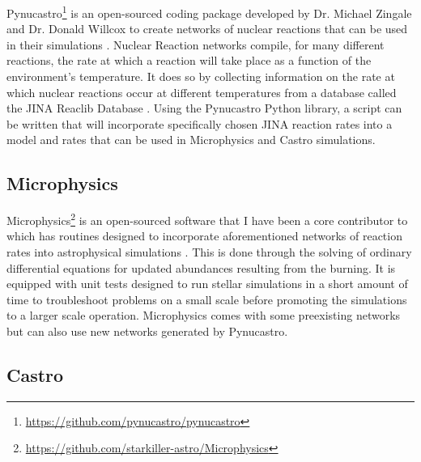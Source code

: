 \documentclass[preprint]{aastex62}
\begin{document}
    Pynucastro\footnote{\url{https://github.com/pynucastro/pynucastro}} is an open-sourced coding package developed by Dr. Michael Zingale and Dr. Donald Willcox to create networks of nuclear reactions that can be used in their simulations \citep{pynucastro}. Nuclear Reaction networks compile, for many different reactions, the rate at which a reaction will take place as a function of the environment's temperature. It does so by collecting information on the rate at which nuclear reactions occur at different temperatures from a database called the JINA Reaclib Database \citep{JINA}. Using the Pynucastro Python library, a script can be written that will incorporate specifically chosen JINA reaction rates into a model and rates that can be used in Microphysics and Castro simulations.
  
  \subsection{Microphysics}
  
    Microphysics\footnote{\url{https://github.com/starkiller-astro/Microphysics}} is an open-sourced software that I have been a core contributor to which has routines designed to incorporate aforementioned networks of reaction rates into astrophysical simulations \citep{Microphysics}. This is done through the solving of ordinary differential equations for updated abundances resulting from the burning. It is equipped with unit tests designed to run stellar simulations in a short amount of time to troubleshoot problems on a small scale before promoting the simulations to a larger scale operation. Microphysics comes with some preexisting networks but can also use new networks generated by Pynucastro. 
  
     
  
  \subsection{Castro}
  
\end{document}
